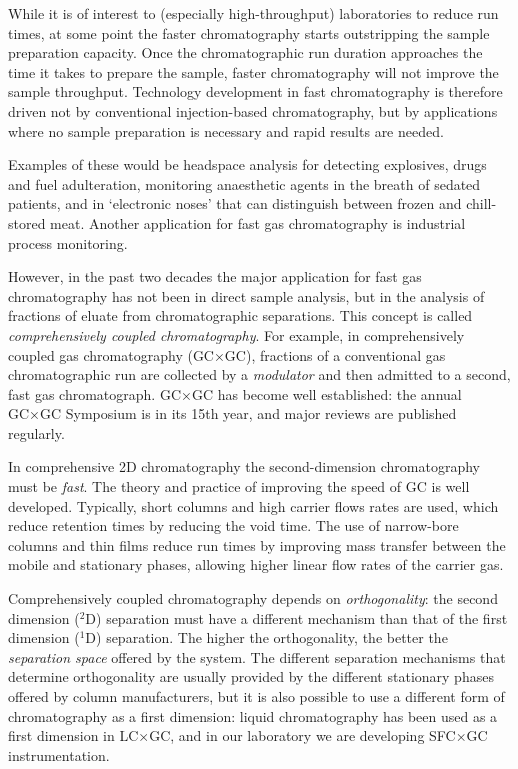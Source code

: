 \documentclass[aip,rsi,preprint,graphicx]{revtex4-1} %
\begin{document}
While it is of interest to (especially high-throughput) laboratories to reduce
run times, at some point the faster chromatography starts outstripping the
sample preparation capacity. Once the chromatographic run duration approaches
the time it takes to prepare the sample, faster chromatography will not improve
the sample throughput. Technology development in fast chromatography is
therefore driven not by conventional injection-based chromatography, but by
applications where no sample preparation is necessary and rapid results are
needed.

Examples of these would be headspace analysis for detecting
explosives\cite{Watson1991}, drugs\cite{He2014} and fuel
adulteration\cite{Hupp2018}, monitoring anaesthetic  agents in the breath of
sedated patients\cite*{Chen2014,Dong2017}, and in `electronic noses' that can
distinguish between frozen and chill-stored meat\cite{Gorska-Horczyczak2017}.
Another application for fast gas chromatography is industrial process
monitoring\cite{White2015}.

However, in the past two decades the major application for fast gas
chromatography has not been in direct sample analysis, but in the analysis of
fractions of eluate from chromatographic separations. This concept is called
\textit{comprehensively coupled chromatography}. For example, in comprehensively
coupled gas chromatography (GC×GC), fractions of a conventional gas
chromatographic run are collected by a \textit{modulator} and then admitted to a
second, fast gas chromatograph\cite{Liu1991}. GC×GC has become well established:
the annual GC×GC Symposium is in its 15th year, and major reviews are published
regularly\cite*{Seeley2013,Prebihalo2018}.

In comprehensive 2D chromatography the second-dimension chromatography must be
\textit{fast}. The theory and practice of improving the speed of GC is well
developed\cite*{Cramers1999,Korytar2002}. Typically, short columns and high
carrier flows rates are used, which reduce retention times by reducing the
void time. The use of narrow-bore columns and thin films reduce run times by
improving mass transfer between the mobile and stationary phases, allowing
higher linear flow rates of the carrier gas.

Comprehensively coupled chromatography depends on \textit{orthogonality}: the
second dimension ($^2$D) separation must have a different mechanism than that of
the first dimension ($^1$D) separation\cite*{Giddings1995,Camenzuli2014}. The
higher the orthogonality, the better the \textit{separation space} offered by
the system. The different separation mechanisms that determine orthogonality are
usually provided by the different stationary phases offered by column
manufacturers, but it is also possible to use a different form of chromatography
as a first dimension: liquid chromatography has been used as a first dimension
in LC×GC\cite{Koning2004}, and in our laboratory we are developing
SFC×GC instrumentation\cite{Venter2004}.
\end{document}
